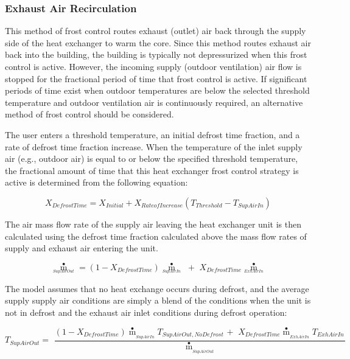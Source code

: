 \subsubsection{Exhaust Air Recirculation}\label{exhaust-air-recirculation}

This method of frost control routes exhaust (outlet) air back through the supply side of the heat exchanger to warm the core. Since this method routes exhaust air back into the building, the building is typically not depressurized when this frost control is active. However, the incoming supply (outdoor ventilation) air flow is stopped for the fractional period of time that frost control is active. If significant periods of time exist when outdoor temperatures are below the selected threshold temperature and outdoor ventilation air is continuously required, an alternative method of frost control should be considered.

The user enters a threshold temperature, an initial defrost time fraction, and a rate of defrost time fraction increase. When the temperature of the inlet supply air (e.g., outdoor air) is equal to or below the specified threshold temperature, the fractional amount of time that this heat exchanger frost control strategy is active is determined from the following equation:

\begin{equation}
{X_{DefrostTime}} = {X_{Initial}} + {X_{RateofIncrease}}({T_{Threshold}} - {T_{SupAirIn}})
\end{equation}

The air mass flow rate of the supply air leaving the heat exchanger unit is then calculated using the defrost time fraction calculated above the mass flow rates of supply and exhaust air entering the unit.

\begin{equation}
{\mathop m\limits^ \bullet_{_{SupAirOut}}} = (1 - {X_{DefrostTime}}){\mathop m\limits^ \bullet_{_{SupAirIn}}}\,\, + \,\,{X_{DefrostTime}}{\mathop m\limits^ \bullet_{_{ExhAirIn}}}
\end{equation}

The model assumes that no heat exchange occurs during defrost, and the average supply supply air conditions are simply a blend of the conditions when the unit is not in defrost and the exhaust air inlet conditions during defrost operation:

\begin{equation}
{T_{SupAirOut}} = \,\,\frac{{(1 - {X_{DefrostTime}}){{\mathop m\limits^ \bullet  }_{_{SupAirIn}}}{T_{SupAirOut,NoDefrost\,}} + \,\,{X_{DefrostTime}}{{\mathop m\limits^ \bullet  }_{_{ExhAirIn}}}{T_{ExhAirIn\,}}}}{{{{\mathop m\limits^ \bullet  }_{_{SupAirOut}}}}}
\end{equation}

